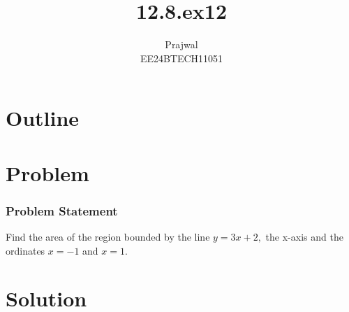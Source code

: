 \documentclass{beamer}
\title{12.8.ex12}
\author{Prajwal \\ EE24BTECH11051}
\theoremstyle{remark}
\numberwithin{equation}{section}
\begin{document}
\begin{frame}
\titlepage
\end{frame}
\section*{Outline}
\begin{frame}
\tableofcontents
\end{frame}
\section{Problem}
\begin{frame}
\frametitle{Problem Statement}
Find the area of the region bounded by the line $y=3x+2,$ the x-axis and the ordinates $x=-1$ and $x=1.$ 
\end{frame}
\section{Solution}
\end{document}
